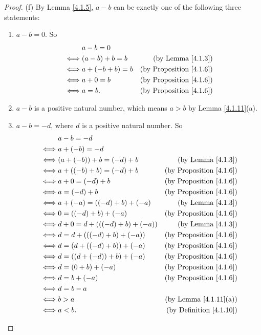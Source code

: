 \begin{proof}{(f)}
By Lemma \ref{4.1.5}, \(a - b\) can be exactly one of the following three statements:
\begin{enumerate}[label=(\roman*)]
    \item \(a - b = 0\).
    So
    \begin{align*}
        & a - b = 0 \\
        \iff & (a - b) + b = b & \text{(by Lemma \ref{4.1.3})} \\
        \iff & a + (-b + b) = b & \text{(by Proposition \ref{4.1.6})} \\
        \iff & a + 0 = b & \text{(by Proposition \ref{4.1.6})} \\
        \iff & a = b. & \text{(by Proposition \ref{4.1.6})}
    \end{align*}
    \item \(a - b\) is a positive natural number, which means \(a > b\) by Lemma \ref{4.1.11}(a).
    \item \(a - b = -d\), where \(d\) is a positive natural number.
    So
    \begin{align*}
        & a - b = -d \\
        \iff & a + (-b) = -d \\
        \iff & (a + (-b)) + b = (-d) + b & \text{(by Lemma \ref{4.1.3})} \\
        \iff & a + ((-b) + b) = (-d) + b & \text{(by Proposition \ref{4.1.6})} \\
        \iff & a + 0 = (-d) + b & \text{(by Proposition \ref{4.1.6})} \\
        \iff & a = (-d) + b & \text{(by Proposition \ref{4.1.6})} \\
        \iff & a + (-a) = ((-d) + b) + (-a) & \text{(by Lemma \ref{4.1.3})} \\
        \iff & 0 = ((-d) + b) + (-a) & \text{(by Proposition \ref{4.1.6})} \\
        \iff & d + 0 = d + (((-d) + b) + (-a)) & \text{(by Lemma \ref{4.1.3})} \\
        \iff & d = d + (((-d) + b) + (-a)) & \text{(by Proposition \ref{4.1.6})} \\
        \iff & d = (d + ((-d) + b)) + (-a) & \text{(by Proposition \ref{4.1.6})} \\
        \iff & d = ((d + (-d)) + b) + (-a) & \text{(by Proposition \ref{4.1.6})} \\
        \iff & d = (0 + b) + (-a) & \text{(by Proposition \ref{4.1.6})} \\
        \iff & d = b + (-a) & \text{(by Proposition \ref{4.1.6})} \\
        \iff & d = b - a \\
        \iff & b > a & \text{(by Lemma \ref{4.1.11}(a))} \\
        \iff & a < b. & \text{(by Definition \ref{4.1.10})} \\
    \end{align*}
\end{enumerate}
\end{proof}

